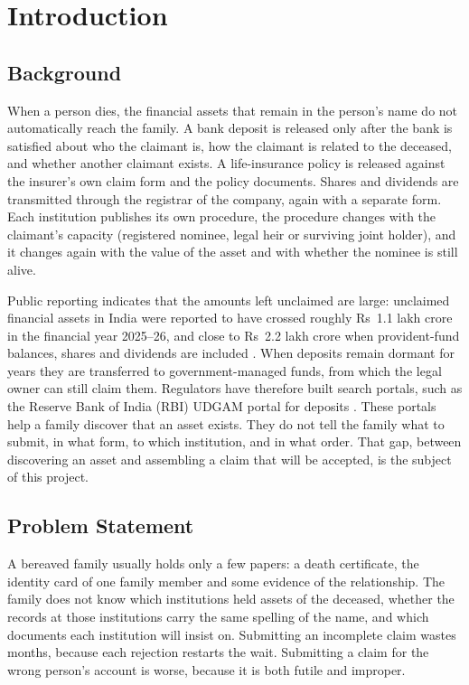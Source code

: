 \chapter{Introduction}
\section{Background}
When a person dies, the financial assets that remain in the person's name do not automatically reach the family. A bank deposit is released only after the bank is satisfied about who the claimant is, how the claimant is related to the deceased, and whether another claimant exists. A life-insurance policy is released against the insurer's own claim form and the policy documents. Shares and dividends are transmitted through the registrar of the company, again with a separate form. Each institution publishes its own procedure, the procedure changes with the claimant's capacity (registered nominee, legal heir or surviving joint holder), and it changes again with the value of the asset and with whether the nominee is still alive.

Public reporting indicates that the amounts left unclaimed are large: unclaimed financial assets in India were reported to have crossed roughly Rs~1.1 lakh crore in the financial year 2025--26, and close to Rs~2.2 lakh crore when provident-fund balances, shares and dividends are included \cite{lapaas2026,bt2026}. When deposits remain dormant for years they are transferred to government-managed funds, from which the legal owner can still claim them. Regulators have therefore built search portals, such as the Reserve Bank of India (RBI) UDGAM portal for deposits \cite{rbi_udgam}. These portals help a family discover that an asset exists. They do not tell the family what to submit, in what form, to which institution, and in what order. That gap, between discovering an asset and assembling a claim that will be accepted, is the subject of this project.

\section{Problem Statement}
A bereaved family usually holds only a few papers: a death certificate, the identity card of one family member and some evidence of the relationship. The family does not know which institutions held assets of the deceased, whether the records at those institutions carry the same spelling of the name, and which documents each institution will insist on. Submitting an incomplete claim wastes months, because each rejection restarts the wait. Submitting a claim for the wrong person's account is worse, because it is both futile and improper.

